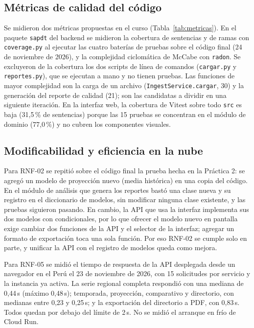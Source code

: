 \documentclass[conference]{IEEEtran}
\begin{document}
\subsection{Métricas de calidad del código}
Se midieron dos métricas propuestas en el curso (Tabla~\ref{tab:metricas}). En el paquete \texttt{sapdt} del backend se midieron la cobertura de sentencias y de ramas con \texttt{coverage.py} al ejecutar las cuatro baterías de pruebas sobre el código final (24 de noviembre de 2026), y la complejidad ciclomática de McCabe \cite{mccabe1976} con \texttt{radon}. Se excluyeron de la cobertura los dos scripts de línea de comandos (\texttt{cargar.py} y \texttt{reportes.py}), que se ejecutan a mano y no tienen pruebas. Las funciones de mayor complejidad son la carga de un archivo (\texttt{IngestService.cargar}, 30) y la generación del reporte de calidad (21); son las candidatas a dividir en una siguiente iteración. En la interfaz web, la cobertura de Vitest sobre todo \texttt{src} es baja (31,5\,\% de sentencias) porque las 15 pruebas se concentran en el módulo de dominio (77,0\,\%) y no cubren los componentes visuales.

\subsection{Modificabilidad y eficiencia en la nube}
Para RNF-02 se repitió sobre el código final la prueba hecha en la Práctica 2: se agregó un modelo de proyección nuevo (media histórica) en una copia del código. En el módulo de análisis que genera los reportes bastó una clase nueva y su registro en el diccionario de modelos, sin modificar ninguna clase existente, y las pruebas siguieron pasando. En cambio, la API que usa la interfaz implementa sus dos modelos con condicionales, por lo que ofrecer el modelo nuevo en pantalla exige cambiar dos funciones de la API y el selector de la interfaz; agregar un formato de exportación toca una sola función. Por eso RNF-02 se cumple solo en parte, y unificar la API con el registro de modelos queda como mejora.

Para RNF-05 se midió el tiempo de respuesta de la API desplegada desde un navegador en el Perú el 23 de noviembre de 2026, con 15 solicitudes por servicio y la instancia ya activa. La serie regional completa respondió con una mediana de 0,44\,s (máximo 0,48\,s); temporada, proyección, comparativo y directorio, con medianas entre 0,23 y 0,25\,s; y la exportación del directorio a PDF, con 0,83\,s. Todos quedan por debajo del límite de 2\,s. No se midió el arranque en frío de Cloud Run.
\end{document}

